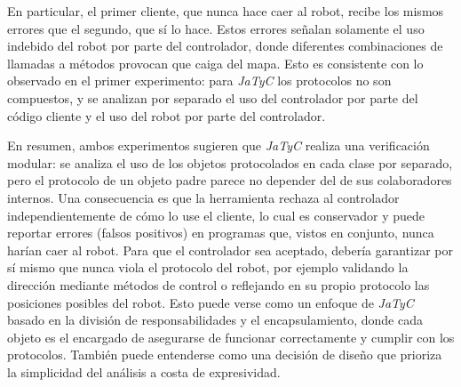 En particular, el primer cliente, que nunca hace caer al robot, recibe los mismos errores que el segundo, que sí lo hace. Estos errores señalan solamente el uso indebido del robot por parte del controlador, donde diferentes combinaciones de llamadas a métodos provocan que caiga del mapa. Esto es consistente con lo observado en el primer experimento: para \textit{JaTyC} los protocolos no son compuestos, y se analizan por separado el uso del controlador por parte del código cliente y el uso del robot por parte del controlador.

En resumen, ambos experimentos sugieren que \textit{JaTyC} realiza una verificación modular: se analiza el uso de los objetos protocolados en cada clase por separado, pero el protocolo de un objeto padre parece no depender del de sus colaboradores internos. Una consecuencia es que la herramienta rechaza al controlador independientemente de cómo lo use el cliente, lo cual es conservador y puede reportar errores (falsos positivos) en programas que, vistos en conjunto, nunca harían caer al robot. Para que el controlador sea aceptado, debería garantizar por sí mismo que nunca viola el protocolo del robot, por ejemplo validando la dirección mediante métodos de control o reflejando en su propio protocolo las posiciones posibles del robot. Esto puede verse como un enfoque de \textit{JaTyC} basado en la división de responsabilidades y el encapsulamiento, donde cada objeto es el encargado de asegurarse de funcionar correctamente y cumplir con los protocolos. También puede entenderse como una decisión de diseño que prioriza la simplicidad del análisis a costa de expresividad.





